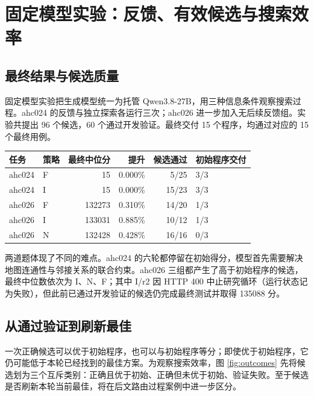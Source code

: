 \section{固定模型实验：反馈、有效候选与搜索效率}\label{sec:feedback}
\subsection{最终结果与候选质量}
固定模型实验把生成模型统一为托管 Qwen3.8-27B，用三种信息条件观察搜索过程。ahc024 的反馈与独立探索各运行三次；ahc026 进一步加入无后续反馈组。实验共提出 96 个候选，60 个通过开发验证。最终交付 15 个程序，均通过对应的 15 个最终用例。


\begin{smalltable}
\begin{tabularx}{\linewidth}{@{}llrrrL@{}}\toprule
任务 & 策略 & 最终中位分 & 提升 & 候选通过 & 初始程序交付\\\midrule
ahc024 & F & 15 & 0.000\% & 5/25 & 3/3\\
ahc024 & I & 15 & 0.000\% & 15/23 & 3/3\\
ahc026 & F & 132273 & 0.310\% & 14/20 & 1/3\\
ahc026 & I & 133031 & 0.885\% & 10/12 & 1/3\\
ahc026 & N & 132428 & 0.428\% & 16/16 & 0/3\\\bottomrule
\end{tabularx}
\end{smalltable}

两道题体现了不同的难点。ahc024 的六轮都停留在初始得分，模型首先需要解决地图连通性与邻接关系的联合约束。ahc026 三组都产生了高于初始程序的候选，最终中位数依次为 I、N、F；其中 I/r2 因 HTTP 400 中止研究循环（运行状态记为失败），但此前已通过开发验证的候选仍完成最终测试并取得 135088 分。

\subsection{从通过验证到刷新最佳}
一次正确候选可以优于初始程序，也可以与初始程序等分；即使优于初始程序，它仍可能低于本轮已经找到的最佳方案。为观察搜索效率，图 \ref{fig:outcomes} 先将候选划为三个互斥类别：正确且优于初始、正确但未优于初始、验证失败。至于候选是否刷新本轮当前最佳，将在后文路由过程案例中进一步区分。


